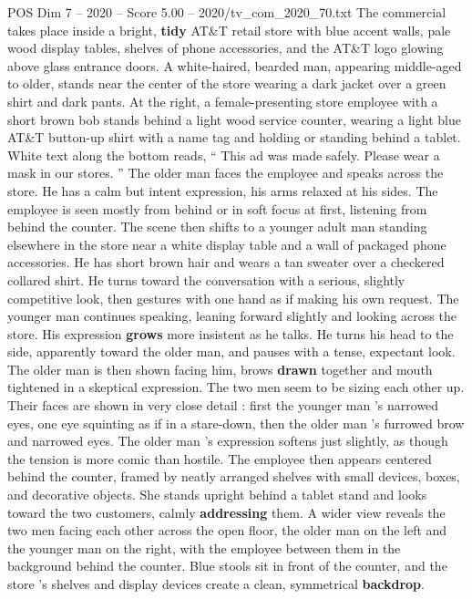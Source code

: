 \begin{textsample}{POS Dim 7 – 2020 – Score 5.00 – 2020/tv\_com\_2020\_70.txt}  \label{ex:f7_pos_090}
The commercial takes place inside a bright, \textbf{tidy} AT\&T retail store with blue accent walls, pale wood display tables, shelves of phone accessories, and the AT\&T logo glowing above glass entrance doors.
A white-haired, bearded man, appearing middle-aged to older, stands near the center of the store wearing a dark jacket over a green shirt and dark pants.
At the right, a female-presenting store employee with a short brown bob stands behind a light wood service counter, wearing a light blue AT\&T button-up shirt with a name tag and holding or standing behind a tablet.
White text along the bottom reads, “ This ad was made safely.
Please wear a mask in our stores. ” The older man faces the employee and speaks across the store.
He has a calm but intent expression, his arms relaxed at his sides.
The employee is seen mostly from behind or in soft focus at first, listening from behind the counter.
The scene then shifts to a younger adult man standing elsewhere in the store near a white display table and a wall of packaged phone accessories.
He has short brown hair and wears a tan sweater over a checkered collared shirt.
He turns toward the conversation with a serious, slightly competitive look, then gestures with one hand as if making his own request.
The younger man continues speaking, leaning forward slightly and looking across the store.
His expression \textbf{grows} more insistent as he talks.
He turns his head to the side, apparently toward the older man, and pauses with a tense, expectant look.
The older man is then shown facing him, brows \textbf{drawn} together and mouth tightened in a skeptical expression.
The two men seem to be sizing each other up.
Their faces are shown in very close detail : first the younger man ’s narrowed eyes, one eye squinting as if in a stare-down, then the older man ’s furrowed brow and narrowed eyes.
The older man ’s expression softens just slightly, as though the tension is more comic than hostile.
The employee then appears centered behind the counter, framed by neatly arranged shelves with small devices, boxes, and decorative objects.
She stands upright behind a tablet stand and looks toward the two customers, calmly \textbf{addressing} them.
A wider view reveals the two men facing each other across the open floor, the older man on the left and the younger man on the right, with the employee between them in the background behind the counter.
Blue stools sit in front of the counter, and the store ’s shelves and display devices create a clean, symmetrical \textbf{backdrop}.

\end{textsample}

